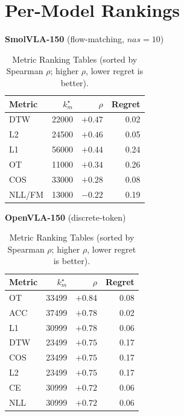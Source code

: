 \documentclass[11pt]{article}
\begin{document}
\section{Per-Model Rankings}
\label{sec:permodel}

\begin{table}[h]
\centering
\caption{Metric Ranking Tables (sorted by Spearman $\rho$; higher $\rho$, lower regret is better).}
\begin{minipage}[t]{0.48\textwidth}
\centering \textbf{SmolVLA-150} (flow-matching, $nas{=}10$)\\[2pt]
\begin{tabular}{lrrr}
\toprule
Metric & $k_m^\star$ & $\rho$ & Regret \\ \midrule
DTW    & 22000 & $+0.47$ & 0.02 \\
L2     & 24500 & $+0.46$ & 0.05 \\
L1     & 56000 & $+0.44$ & 0.24 \\
OT     & 11000 & $+0.34$ & 0.26 \\
COS    & 33000 & $+0.28$ & 0.08 \\
NLL/FM & 13000 & $-0.22$ & 0.19 \\
\bottomrule
\end{tabular}
\end{minipage}
\hfill
\begin{minipage}[t]{0.48\textwidth}
\centering \textbf{OpenVLA-150} (discrete-token)\\[2pt]
\begin{tabular}{lrrr}
\toprule
Metric & $k_m^\star$ & $\rho$ & Regret \\ \midrule
OT   & 33499 & $+0.84$ & 0.08 \\
ACC  & 37499 & $+0.78$ & 0.02 \\
L1   & 30999 & $+0.78$ & 0.06 \\
DTW  & 23499 & $+0.75$ & 0.17 \\
COS  & 23499 & $+0.75$ & 0.17 \\
L2   & 23499 & $+0.75$ & 0.17 \\
CE   & 30999 & $+0.72$ & 0.06 \\
NLL  & 30999 & $+0.72$ & 0.06 \\
\bottomrule
\end{tabular}
\end{minipage}

\vspace{1em}


\end{table}
\end{document}

